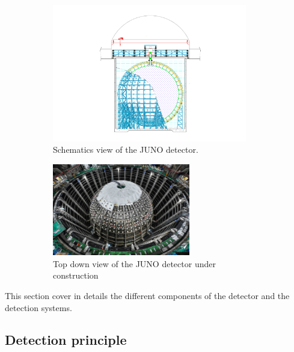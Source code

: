 \documentclass[../main.tex]{subfiles}
\begin{document}
\begin{figure}[ht]
  \centering
  \begin{subfigure}[b]{0.45\textwidth}
    \centering
    \includegraphics[height=6cm]{images/juno/drawing_schema.png}
    \caption{Schematics view of the JUNO detector.}
    \label{fig:juno:juno-schema}
  \end{subfigure}
  \hfill
  \begin{subfigure}[b]{0.45\textwidth}
    \centering
    \includegraphics[height=4cm]{images/juno/top_down_view.jpg}
    \caption{Top down view of the JUNO detector under construction}
  \end{subfigure}
  \caption{}
\end{figure}

This section cover in details the different components of the detector and the detection systems.

\subsection{Detection principle}
\end{document}

